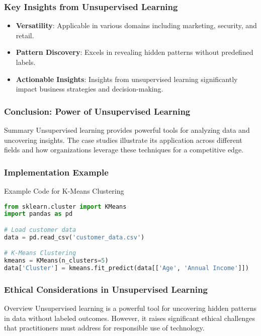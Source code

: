 \documentclass[aspectratio=169]{beamer}
\begin{document}
\begin{frame}[fragile]
    \frametitle{Key Insights from Unsupervised Learning}
    \begin{itemize}
        \item \textbf{Versatility}: Applicable in various domains including marketing, security, and retail.
        \item \textbf{Pattern Discovery}: Excels in revealing hidden patterns without predefined labels.
        \item \textbf{Actionable Insights}: Insights from unsupervised learning significantly impact business strategies and decision-making.
    \end{itemize}
\end{frame}

\begin{frame}[fragile]
    \frametitle{Conclusion: Power of Unsupervised Learning}
    \begin{block}{Summary}
        Unsupervised learning provides powerful tools for analyzing data and uncovering insights. 
        The case studies illustrate its application across different fields and how organizations leverage these techniques for a competitive edge.
    \end{block}
\end{frame}

\begin{frame}[fragile]
    \frametitle{Implementation Example}
    \begin{block}{Example Code for K-Means Clustering}
    \begin{lstlisting}[language=Python]
from sklearn.cluster import KMeans
import pandas as pd

# Load customer data
data = pd.read_csv('customer_data.csv')

# K-Means Clustering 
kmeans = KMeans(n_clusters=5)
data['Cluster'] = kmeans.fit_predict(data[['Age', 'Annual Income']])
    \end{lstlisting}
    \end{block}
\end{frame}

\begin{frame}[fragile]
  \frametitle{Ethical Considerations in Unsupervised Learning}
  \begin{block}{Overview}
    Unsupervised learning is a powerful tool for uncovering hidden patterns in data without labeled outcomes. 
    However, it raises significant ethical challenges that practitioners must address for responsible use of technology.
  \end{block}
\end{frame}
\end{document}
